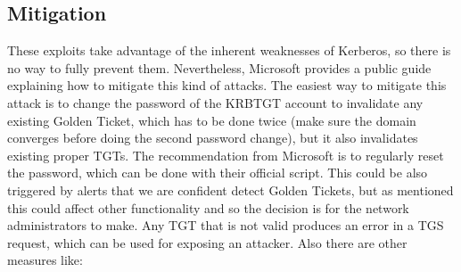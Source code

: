 \subsection{Mitigation}
These exploits take advantage of the inherent weaknesses of Kerberos, so there is no way to fully prevent them. Nevertheless, Microsoft provides a public guide explaining how to mitigate this kind of attacks\cite{microsoft_mitigation}.
The easiest way to mitigate this attack is to change the password of the KRBTGT account to invalidate any existing Golden Ticket, which has to be done twice (make sure the domain converges before doing the second password change\cite{hood}), but it also invalidates existing proper TGTs.
\linej
The recommendation from Microsoft is to regularly reset the password\cite{tarlogic_comprehension}\cite{adsecurity_483}, which can be done with their official script\cite{reset_script}. This could be also triggered by alerts that we are confident detect Golden Tickets, but as mentioned this could affect other functionality and so the decision is for the network administrators to make. Any TGT that is not valid produces an error in a TGS request, which can be used for exposing an attacker\cite{scom_GT}.
\linej
\linej
Also there are other measures like:
